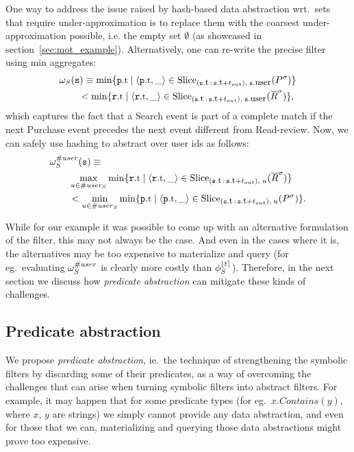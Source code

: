 One way to address the issue raised by hash-based data abstraction wrt.\ sets 
that require under-approximation is to replace them with the coarsest 
under-approximation possible, i.e. the empty set $\emptyset$ (as showcased in 
section~\ref{sec:mot_example}).
Alternatively, one can re-write the precise filter using min aggregates:
\begin{align*}
&
\PrecedesPP(\symv{s}) \equiv 
\min \{ 
\facc{\symv{p}}{t} \mid 
\tuple{\facc{\symv{p}}{t}, \_} \in 
\slice{\syms{P}}
{(\facc{\symv{s}}{t}\,:\,\facc{\symv{s}}{t} + t_{out}),\; 
	\facc{\symv{s}}{user}}
\}
\\
&\qquad
< \min \{ 
\facc{\symv{r}}{t} \mid 
\tuple{\facc{\symv{r}}{t}, \_} \in 
\slice{\syms{\oR}}
{(\facc{\symv{s}}{t}\,:\,\facc{\symv{s}}{t} + t_{out}),\; 
	\facc{\symv{s}}{user}} 
\},
\end{align*}
which captures the fact that a Search event is part of a complete match if the 
next Purchase event precedes the next event different from Read-review.
Now, we can safely use hashing to abstract over user ids as follows:
\begin{align*}
&
\PrecedesPP^{\hashid{user}}(\symv{s}) \equiv 
\\
&\qquad
\max_{u \in \hashid{user_S}}
\min \{ 
\facc{\symv{r}}{t} \mid 
\tuple{\facc{\symv{r}}{t}, \_} \in 
\slice{\syms{\oR}}
{(\facc{\symv{s}}{t}\,:\,\facc{\symv{s}}{t} + t_{out}),\; 
	u} 
\}
\\
&\qquad
< 
\min_{u \in \hashid{user_S}}
\min \{ 
\facc{\symv{p}}{t} \mid 
\tuple{\facc{\symv{p}}{t}, \_} \in 
\slice{\syms{P}}
{(\facc{\symv{s}}{t}\,:\,\facc{\symv{s}}{t} + t_{out}),\; 
	u}
\}.
\end{align*}

While for our example it was possible to come up with an alternative formulation
of the filter, this may not always be the case. 
And even in the cases where it is, the alternatives may be too expensive to
materialize and query (for eg.\ evaluating $\omega_S^{\# user}$ is
clearly more costly than $\phi_{S}^{\lfloor t \rceil}$).
Therefore, in the next section we discuss how {\em predicate abstraction} can 
mitigate these kinds of challenges.

\subsection{Predicate abstraction}
\label{sec:pred_abstraction}


We propose {\em predicate abstraction}, ie.\ the technique of strengthening
 the
symbolic filters by discarding some of their predicates, as a way of
 overcoming
the challenges that can arise when turning symbolic filters into abstract 
filters.
For example, it may happen that for some predicate types
(for eg.\ $x.Contains(y)$, where $x$, $y$ are strings) we simply cannot
 provide
any data abstraction, and even for those that we can, materializing and
 querying
those data abstractions might prove too expensive.

